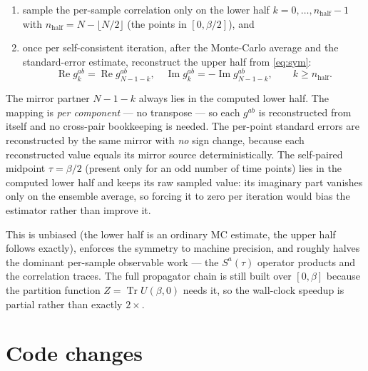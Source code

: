 \documentclass[11pt]{article}
\newcommand{\g}{g}
\newcommand{\Tr}{\operatorname{Tr}}
\newcommand{\bt}{\beta}
\begin{document}
\begin{enumerate}
  \item sample the per-sample correlation only on the lower half
        $k=0,\dots,n_{\mathrm{half}}-1$ with $n_{\mathrm{half}}=N-\lfloor N/2\rfloor$
        (the points in $[0,\bt/2]$), and
  \item once per self-consistent iteration, after the Monte-Carlo average and the
        standard-error estimate, reconstruct the upper half from \eqref{eq:sym}:
        \[
          \operatorname{Re}\g^{ab}_k =  \operatorname{Re}\g^{ab}_{N-1-k},\quad
          \operatorname{Im}\g^{ab}_k = -\operatorname{Im}\g^{ab}_{N-1-k},
          \qquad k\ge n_{\mathrm{half}} .
        \]
\end{enumerate}
The mirror partner $N-1-k$ always lies in the computed lower half. The mapping is
\emph{per component} --- no transpose --- so each $\g^{ab}$ is reconstructed from itself
and no cross-pair bookkeeping is needed. The per-point standard errors are reconstructed
by the same mirror with \emph{no} sign change, because each reconstructed value equals
its mirror source deterministically. The self-paired midpoint $\tau=\bt/2$ (present only
for an odd number of time points) lies in the computed lower half and keeps its raw
sampled value: its imaginary part vanishes only on the ensemble average, so forcing it
to zero per iteration would bias the estimator rather than improve it.

This is unbiased (the lower half is an ordinary MC estimate, the upper half follows
exactly), enforces the symmetry to machine precision, and roughly halves the dominant
per-sample observable work --- the $S^a(\tau)$ operator products and the correlation
traces. The full propagator chain is still built over $[0,\bt]$ because the partition
function $Z=\Tr U(\bt,0)$ needs it, so the wall-clock speedup is partial rather than
exactly $2\times$.

\section{Code changes}
\end{document}
